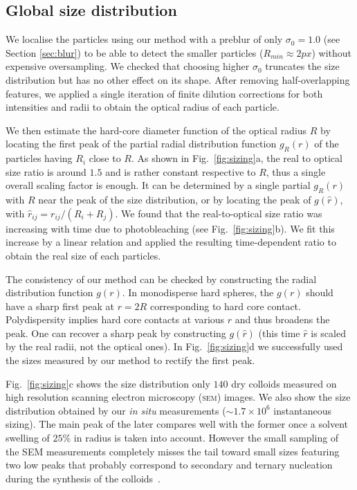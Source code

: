 \documentclass[8.5pt,twoside,twocolumn]{article}
\begin{document}
\subsection{Global size distribution}

We localise the particles using our method with a preblur of only $\sigma_0=1.0$ (see Section \ref{sec:blur}) to be able to detect the smaller particles ($R_{min}\approx \unit{2}{px}$) without expensive oversampling. We checked that choosing higher $\sigma_0$ truncates the size distribution but has no other effect on its shape. After removing half-overlapping features, we applied a single iteration of finite dilution corrections for both intensities and radii to obtain the optical radius of each particle.



We then estimate the hard-core diameter function of the optical radius $R$ by locating the first peak of the partial radial distribution function $g_R(r)$ of the particles having $R_i$ close to $R$. As shown in Fig.~\ref{fig:sizing}a, the real to optical size ratio is around $1.5$ and is rather constant respective to $R$, thus a single overall scaling factor is enough. It can be determined by a single partial $g_R(r)$ with $R$ near the peak of the size distribution, or by locating the peak of $g(\hat{r})$, with $\hat{r}_{ij} = r_{ij}/(R_i+R_j)$. We found that the real-to-optical size ratio was increasing with time due to photobleaching (see Fig.~\ref{fig:sizing}b). We fit this increase by a linear relation and applied the resulting time-dependent ratio to obtain the real size of each particles.

The consistency of our method can be checked by constructing the radial distribution function $g(r)$. In monodisperse hard spheres, the $g(r)$ should have a sharp first peak at $r=2R$ corresponding to hard core contact. Polydispersity implies hard core contacts at various $r$ and thus broadens the peak. One can recover a sharp peak by constructing $g(\hat{r})$ (this time $\hat{r}$ is scaled by the real radii, not the optical ones). In Fig.~\ref{fig:sizing}d we successfully used the sizes measured by our method to rectify the first peak.

Fig.~\ref{fig:sizing}c shows the size distribution only $140$ dry colloids measured on high resolution scanning electron microscopy (\textsc{sem}) images. We also show the size distribution obtained by our \emph{in situ} measurements ($\sim 1.7\times 10^6$ instantaneous sizing). The main peak of the later compares well with the former once a solvent swelling of $25\%$ in radius is taken into account. However the small sampling of the SEM measurements completely misses the tail toward small sizes featuring two low peaks that probably correspond to secondary and ternary nucleation during the synthesis of the colloids~\cite{bosma2002,Poon2012}.
\end{document}
